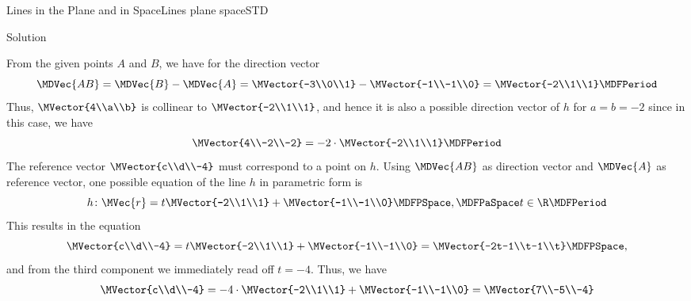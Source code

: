 \begin{MXContent}{Lines in the Plane and in Space}{Lines plane space}{STD}
\begin{MExercise}
\begin{MHint}{Solution}
 \begin{MExerciseItems}
\item{
From the given points $A$ and $B$, we have for the direction vector
\[
 \MDVec{A B}=\MDVec{B}-\MDVec{A}=\MVector{-3\\0\\1}-\MVector{-1\\-1\\0}=\MVector{-2\\1\\1} \MDFPeriod
\]
Thus, $\MVector{4\\a\\b}$ is collinear to $\MVector{-2\\1\\1}$, and hence it is also a possible direction vector of 
$h$ for $a=b=-2$ since in this case, we have
\[
 \MVector{4\\-2\\-2} = -2\cdot\MVector{-2\\1\\1} \MDFPeriod
\]
The reference vector $\MVector{c\\d\\-4}$ must correspond to a point on $h$. Using $\MDVec{A B}$
as direction vector and $\MDVec{A}$ as reference vector, one possible equation of the line $h$ in parametric form
is
\[
 h\colon\MVec{r}=t\MVector{-2\\1\\1}+\MVector{-1\\-1\\0}\MDFPSpace,\MDFPaSpace t\in\R \MDFPeriod
\]
This results in the equation
\[
 \MVector{c\\d\\-4}=t\MVector{-2\\1\\1}+\MVector{-1\\-1\\0}=\MVector{-2t-1\\t-1\\t} \MDFPSpace ,
\]
and from the third component we immediately read off $t=-4$. Thus, we have
\[
 \MVector{c\\d\\-4}=-4\cdot\MVector{-2\\1\\1}+\MVector{-1\\-1\\0}=\MVector{7\\-5\\-4}
\]}
\end{MExerciseItems}
\end{MHint}
\end{MExercise}
\end{MXContent}
